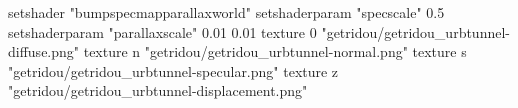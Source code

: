 setshader "bumpspecmapparallaxworld"
setshaderparam "specscale" 0.5
setshaderparam "parallaxscale" 0.01 0.01
texture 0 "getridou/getridou_urbtunnel-diffuse.png"
texture n "getridou/getridou_urbtunnel-normal.png"
texture s "getridou/getridou_urbtunnel-specular.png"
texture z "getridou/getridou_urbtunnel-displacement.png"